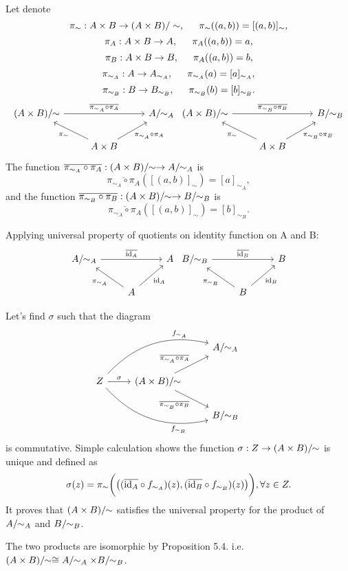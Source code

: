 \begin{solution}
Let denote $$\pi_{\sim}: A\times B \to (A\times B)/\sim, \indent \pi_{\sim}((a,b)) = [(a,b)]_{\sim},$$
$$\pi_{A}: A\times B \to A, \indent \pi_{A}((a,b)) = a,$$
$$\pi_{B}: A\times B \to B, \indent \pi_{A}((a,b)) = b,$$
$$\pi_{\sim_A}: A \to A_{\sim_A}, \indent \pi_{\sim_A}(a) = [a]_{\sim_A},$$
$$\pi_{\sim_B}: B \to B_{\sim_B}, \indent \pi_{\sim_B}(b) = [b]_{\sim_B}.$$
%
\[
\begin{tikzcd}
\quotntws{(A\times B)}{\sim} \arrow[rr, "\overline{\pi_{\sim_A}\circ\pi_A}"] && \quotntws{A}{\sim_A}\\
&A\times B \arrow[ul, "\pi_{\sim}"] \arrow[ur, "\pi_{\sim_A}\circ\pi_A"']&
\end{tikzcd}
\begin{tikzcd}
\quotntws{(A\times B)}{\sim} \arrow[rr, "\overline{\pi_{\sim_B}\circ\pi_B}"] && \quotntws{B}{\sim_B}\\
&A\times B \arrow[ul, "\pi_{\sim}"] \arrow[ur, "\pi_{\sim_B}\circ\pi_B"']&
\end{tikzcd}
\]
The function $\overline{\pi_{\sim_A}\circ\pi_A}: (A\times B)/\!\!\sim\to A/\!\!\sim_A$ is $$\overline{\pi_{\sim_A}\circ\pi_A}([(a,b)]_\sim) = [a]_{\sim_A},$$ and the function $\overline{\pi_{\sim_B}\circ\pi_B}: (A\times B)/\!\!\sim\to B/\!\!\sim_B$ is 
$$\overline{\pi_{\sim_A}\circ\pi_A}([(a,b)]_\sim) = [b]_{\sim_B}.$$

Applying universal property of quotients on identity function on A and B:
%
\[
\begin{tikzcd}
\quotntws{A}{\sim_A} \arrow[rr, "\overline{\text{id}_{A}}"] && A\\
&A\arrow[ul, "\pi_{\sim_A}"] \arrow[ur, "\text{id}_A"']&
\end{tikzcd}
\begin{tikzcd}
\quotntws{B}{\sim_B} \arrow[rr, "\overline{\text{id}_{B}}"] && B\\
&B\arrow[ul, "\pi_{\sim_B}"] \arrow[ur, "\text{id}_B"']&
\end{tikzcd}
\]
 
Let's find $\sigma$ such that the diagram
%
\[
\begin{tikzcd}
&& \quotntws{A}{\sim_A}\\
Z\arrow[r, "\sigma"] \arrow[urr, bend left, "f_{\sim_A}" near end] \arrow[drr, bend right, "f_{\sim_B}"' near end]&\quotntws{(A\times B)}{\sim} \arrow[ur, "\overline{\pi_{\sim_A}\circ\pi_A}"]\arrow[dr, "\overline{\pi_{\sim_B}\circ\pi_B}"'] &\\
&& \quotntws{B}{\sim_B}&
\end{tikzcd}
\]
is commutative. Simple calculation shows the function $\sigma: Z\to (A\times B)/\!\!\sim$ is unique and defined as
$$\sigma(z) = \pi_{\sim}\bigg{(}\big{(}(\overline{\text{id}_{A}}\circ f_{\sim_A})(z), (\overline{\text{id}_{B}}\circ f_{\sim_B})(z)\big{)}\bigg{)}, \forall z\in Z.$$
It proves that $(A\times B)/\!\!\sim$ satisfies the universal property for the product of $A/\!\!\sim_A$ and $B/\!\!\sim_B$.

The two products are isomorphic by Proposition 5.4. i.e. $(A\times B)/\!\!\sim\cong A/\!\!\sim_A\times B/\!\!\sim_B$.
\end{solution}

